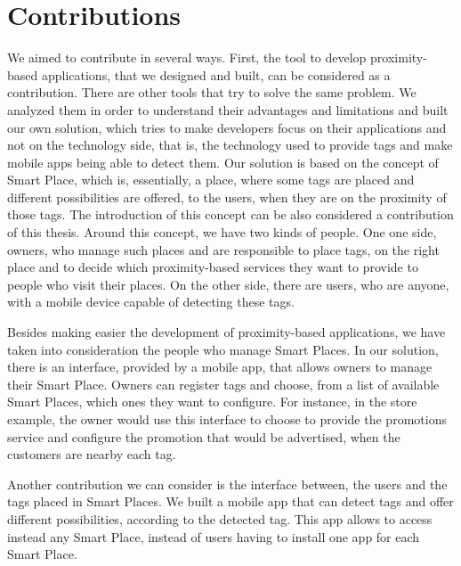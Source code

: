 \section{Contributions}
\label{sec:introduction_contributions}
We aimed to contribute in several ways.
First, the tool to develop proximity-based applications, that we designed and built, can be considered as a contribution.
There are other tools that try to solve the same problem.
We analyzed them in order to understand their advantages and limitations and built our own solution, which tries to make developers focus on their applications and not on the technology side, that is, the technology used to provide tags and make mobile apps being able to detect them.
Our solution is based on the concept of Smart Place, which is, essentially, a place, where some tags are placed and different possibilities are offered, to the users, when they are on the proximity of those tags.
The introduction of this concept can be also considered a contribution of this thesis.
Around this concept, we have two kinds of people.
One one side, owners, who manage such places and are responsible to place tags, on the right place and to decide which proximity-based services they want to provide to people who visit their places.
On the other side, there are users, who are anyone, with a mobile device capable of detecting these tags.

Besides making easier the development of proximity-based applications, we have taken into consideration the people who manage Smart Places.
In our solution, there is an interface, provided by a mobile app, that allows owners to manage their Smart Place. Owners can register tags and choose, from a list of available Smart Places, which ones they want to configure.
For instance, in the store example, the owner would use this interface to choose to provide the promotions service and configure the promotion that would be advertised, when the customers are nearby each tag.

Another contribution we can consider is the interface between, the users and the tags placed in Smart Places.
We built a mobile app that can detect tags and offer different possibilities, according to the detected tag.
This app allows to access instead any Smart Place, instead of users having to install one app for each Smart Place.

